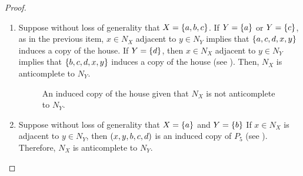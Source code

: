 \begin{proof}
\begin{enumerate}[label=(\roman*)]
\begin{figure}[htb!]
                \caption{An induced copy of the house given that $N_X$ is not
                    anticomplete to $N_Y$.}
                \label{fig:anti_2}
            \end{figure}
        \item Suppose without loss of generality that $X=\left\{a,b,c\right\}$. If
            $Y=\left\{a\right\}$ or $Y=\left\{c\right\}$, as in the previous item, $x\in N_X$ adjacent
            to $y\in N_Y$ implies that $\left\{a,c,d,x,y\right\}$ induces a copy of the
            house. If $Y=\left\{d\right\}$, then $x\in N_X$ adjacent to $y\in N_Y$ implies
            that $\left\{b,c,d,x,y\right\}$ induces a copy of the house (see
            ). Then, $N_{X}$ is anticomplete to $N_Y$.

            \begin{figure}[htb!]
                \centering
                \caption{An induced copy of the house given that $N_X$ is not
                    anticomplete to $N_Y$.}
                \label{fig:anti_3}
            \end{figure}
        \item Suppose without loss of generality that $X=\left\{a\right\}$ and $Y=\left\{b\right\}$ If
            $x\in N_X$ is adjacent to $y\in N_Y$, then $\left(x,y,b,c,d\right)$ is an
            induced copy of $P_5$ (see ). Therefore, $N_X$ is
            anticomplete to $N_Y$.


\end{enumerate}
\end{proof}

